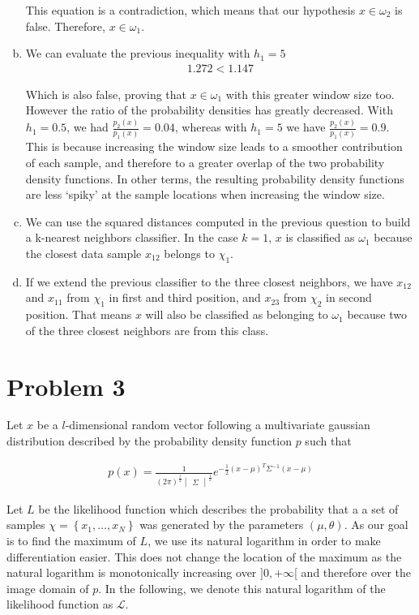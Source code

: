 \documentclass[a4paper, 10pt, twoside]{article}
\begin{document}
\begin{enumerate}[a)]
          This equation is a contradiction, which means that our hypothesis $x \in \omega_2$ is false. Therefore, $x \in \omega_1$.
    \item We can evaluate the previous inequality with $h_1 = 5$
          \begin{align*}
              1.272 < 1.147
          \end{align*}

          Which is also false, proving that $x \in \omega_1$ with this greater window size too. However the ratio of the probability densities has greatly decreased. With $h_1 = 0.5$, we had $\frac{p_2(x)}{p_1(x)} = 0.04$, whereas with $h_1 = 5$ we have $\frac{p_2(x)}{p_1(x)} = 0.9$. This is because increasing the window size leads to a smoother contribution of each sample, and therefore to a greater overlap of the two probability density functions. In other terms, the resulting probability density functions are less `spiky' at the sample locations when increasing the window size.
    \item We can use the squared distances computed in the previous question to build a k-nearest neighbors classifier. In the case $k = 1$, $x$ is classified as $\omega_1$ because the closest data sample $x_{12}$ belongs to $\chi_1$.
    \item If we extend the previous classifier to the three closest neighbors, we have $x_{12}$ and $x_{11}$ from $\chi_1$ in first and third position, and $x_{23}$ from $\chi_2$ in second position. That means $x$ will also be classified as belonging to $\omega_1$ because two of the three closest neighbors are from this class.
\end{enumerate}

\section*{Problem 3}
Let $x$ be a $l$-dimensional random vector following a multivariate gaussian distribution described by the probability density function $p$ such that

\begin{align*}
    p(x) =
    \frac{1}{(2\pi)^\frac{l}{2} \begin{vmatrix} \Sigma \end{vmatrix}^\frac{1}{2}}
    e^{-\frac{1}{2} (x-\mu)^T \Sigma^{-1} (x-\mu)}
\end{align*}

Let $L$ be the likelihood function which describes the probability that a a set of samples $\chi = \left\{x_1, \dots, x_N\right\}$ was generated by the parameters $(\mu, \theta)$. As our goal is to find the maximum of $L$, we use its natural logarithm in order to make differentiation easier. This does not change the location of the maximum as the natural logarithm is monotonically increasing over $]0, +\infty$[ and therefore over the image domain of $p$. In the following, we denote this natural logarithm of the likelihood function as $\mathcal{L}$.
\end{document}
